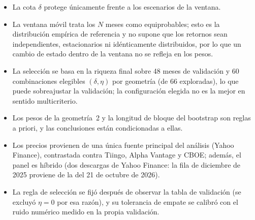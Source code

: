 \begin{itemize}
\item La cota $\delta$ protege únicamente frente a los escenarios de la ventana.
    \item La ventana móvil trata los $N$ meses como equiprobables; esto es la distribución empírica de referencia y no supone que los retornos sean independientes, estacionarios ni idénticamente distribuidos, por lo que un cambio de estado dentro de la ventana no se refleja en los pesos.
    \item La selección se basa en la riqueza final sobre 48 meses de validación y 60 combinaciones elegibles $(\delta,\eta)$ por geometría (de 66 exploradas), lo que puede sobreajustar la validación; la configuración elegida no es la mejor en sentido multicriterio.
    \item Los pesos de la geometría~2 y la longitud de bloque del bootstrap son reglas a priori, y las conclusiones están condicionadas a ellas.
    \item Los precios provienen de una única fuente principal del análisis (Yahoo Finance), contrastada contra Tiingo, Alpha Vantage y CBOE; además, el panel es híbrido (dos descargas de Yahoo Finance: la fila de diciembre de 2025 proviene de la del 21 de octubre de 2026).
    \item La regla de selección se fijó después de observar la tabla de validación (se excluyó $\eta=0$ por esa razón), y su tolerancia de empate se calibró con el ruido numérico medido en la propia validación.

\end{itemize}
